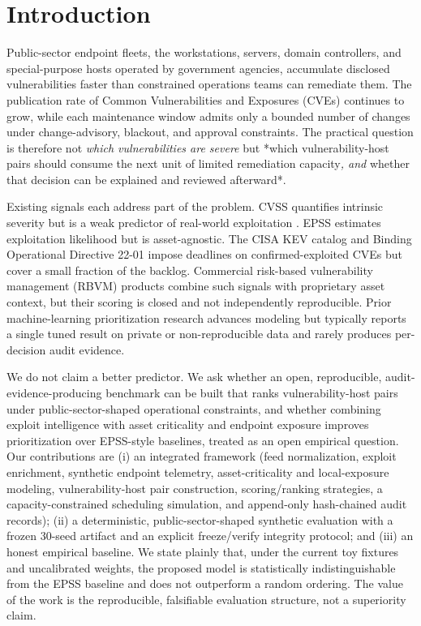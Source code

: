 \section{Introduction}

Public-sector endpoint fleets, the workstations, servers, domain controllers, and
special-purpose hosts operated by government agencies, accumulate disclosed
vulnerabilities faster than constrained operations teams can remediate them. The
publication rate of Common Vulnerabilities and Exposures (CVEs) continues to grow,
while each maintenance window admits only a bounded number of changes under
change-advisory, blackout, and approval constraints. The practical question is
therefore not \textit{which vulnerabilities are severe} but *which vulnerability-host
pairs should consume the next unit of limited remediation capacity\textit{, and }whether
that decision can be explained and reviewed afterward*.

Existing signals each address part of the problem. CVSS \cite{first_cvss_v31}
quantifies intrinsic severity but is a weak predictor of real-world exploitation
\cite{allodi2014comparing}. EPSS \cite{jacobs2021epss} estimates exploitation likelihood
but is asset-agnostic. The CISA KEV catalog \cite{cisa_kev} and Binding Operational
Directive 22-01 \cite{cisa_bod2201} impose deadlines on confirmed-exploited CVEs but
cover a small fraction of the backlog. Commercial risk-based vulnerability
management (RBVM) products combine such signals with proprietary asset context, but
their scoring is closed and not independently reproducible. Prior machine-learning
prioritization research advances modeling but typically reports a single tuned
result on private or non-reproducible data and rarely produces per-decision audit
evidence.

We do not claim a better predictor. We ask whether an open, reproducible,
audit-evidence-producing benchmark can be built that ranks vulnerability-host pairs
under public-sector-shaped operational constraints, and whether combining exploit
intelligence with asset criticality and endpoint exposure improves prioritization
over EPSS-style baselines, treated as an open empirical question. Our
contributions are (i) an integrated framework (feed normalization, exploit
enrichment, synthetic endpoint telemetry, asset-criticality and local-exposure
modeling, vulnerability-host pair construction, scoring/ranking strategies, a
capacity-constrained scheduling simulation, and append-only hash-chained audit
records); (ii) a deterministic, public-sector-shaped synthetic evaluation with a
frozen 30-seed artifact and an explicit freeze/verify integrity protocol; and (iii)
an honest empirical baseline. We state plainly that, under the current toy fixtures
and uncalibrated weights, the proposed model is statistically indistinguishable
from the EPSS baseline and does not outperform a random ordering. The value of the
work is the reproducible, falsifiable evaluation structure, not a superiority claim.

